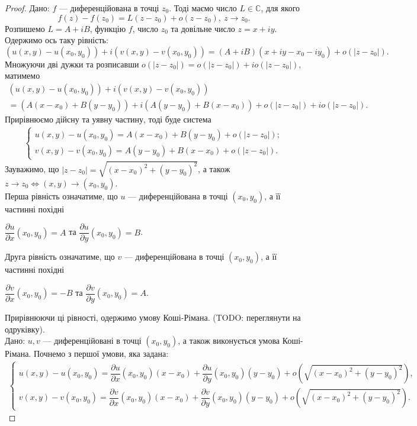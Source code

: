 \documentclass{math_library}
\begin{document}
\begin{proof}
\rightproof Дано: $f$ --- диференційована в точці $z_0$. Тоді маємо число $L \in \mathbb{C}$, для якого
\[
f(z) - f(z_0) = L(z-z_0) + o(z-z_0),\ z \to z_0.
\]
Розпишемо $L = A + i B$, функцію $f$, число $z_0$ та довільне число $z = x+iy$. Одержимо ось таку рівність:
\[
(u(x,y) - u(x_0,y_0)) + i(v(x,y) - v(x_0,y_0)) = (A+iB)(x+iy - x_0 - iy_0) + o(|z-z_0|).
\]
Множуючи дві дужки та розписавши $o(|z-z_0|) = o(|z-z_0|) + i o(|z-z_0|)$, матимемо
\begin{multline*}
(u(x,y) - u(x_0,y_0)) + i(v(x,y) - v(x_0,y_0)) \\
 = (A(x-x_0) + B(y-y_0)) + i(A(y-y_0) + B(x-x_0)) + o(|z-z_0|) + i o(|z-z_0|).
\end{multline*}
Прирівнюємо дійсну та уявну частину, тоді буде система
\begin{align*}
\begin{cases}
u(x,y)-u(x_0,y_0)=A(x-x_0)+B(y-y_0)+o(|z-z_0|);\\
v(x,y)-v(x_0,y_0)=A(y-y_0)+B(x-x_0)+o(|z-z_0|).
\end{cases}
\end{align*}
Зауважимо, що $|z-z_0| = \sqrt{(x-x_0)^2 + (y-y_0)^2}$, а також $z \to z_0 \iff (x,y) \to (x_0,y_0)$. \\
Перша рівність означатиме, що $u$ --- диференційована в точці $(x_0,y_0)$, а її частинні похідні
\begin{center}
$\dfrac{\partial u}{\partial x}(x_0,y_0) = A$ та $\dfrac{\partial u}{\partial y}(x_0,y_0) = B$. 
\end{center}
Друга рівність означатиме, що  $v$ --- диференційована в точці $(x_0,y_0)$, а її частинні похідні
\begin{center}
$\dfrac{\partial v}{\partial x}(x_0,y_0) = -B$ та $\dfrac{\partial v}{\partial y}(x_0,y_0) = A$. 
\end{center}
Прирівнюючи ці рівності, одержимо умову Коші-Рімана. (TODO: переглянути на одруківку).
\bigskip \\
\rightproof Дано: $u,v$ --- диференційовані в точці $(x_0,y_0)$, а також виконується умова Коші-Рімана. Почнемо з першої умови, яка задана:
\begin{align*}
\begin{cases}
u(x,y) - u(x_0,y_0) = \dfrac{\partial u}{\partial x}(x_0,y_0) (x-x_0) + \dfrac{\partial u}{\partial y}(x_0,y_0) (y-y_0) + o(\sqrt{(x-x_0)^2 + (y-y_0)^2}), \\
v(x,y) - v(x_0,y_0) = \dfrac{\partial v}{\partial x}(x_0,y_0) (x-x_0) + \dfrac{\partial v}{\partial y}(x_0,y_0) (y-y_0) + o(\sqrt{(x-x_0)^2 + (y-y_0)^2}).

\end{cases}
\end{align*}
\end{proof}
\end{document}
